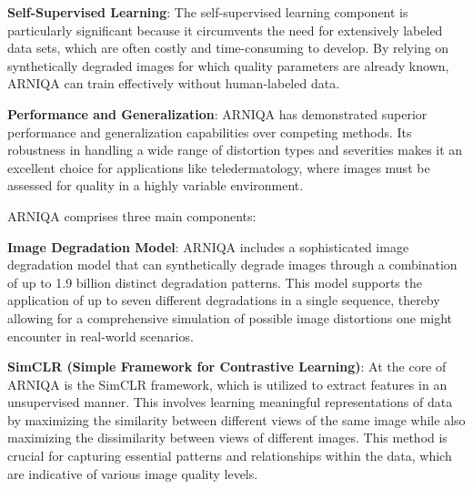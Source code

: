 \textbf{Self-Supervised Learning}: The self-supervised learning component is particularly significant because it circumvents the need for extensively labeled data sets, which are often costly and time-consuming to develop. By relying on synthetically degraded images for which quality parameters are already known, ARNIQA can train effectively without human-labeled data. \par
\vspace{\baselineskip}
\noindent
\textbf{Performance and Generalization}: ARNIQA has demonstrated superior performance and generalization capabilities over competing methods. Its robustness in handling a wide range of distortion types and severities makes it an excellent choice for applications like teledermatology, where images must be assessed for quality in a highly variable environment. \par
\vspace{\baselineskip}
\noindent
ARNIQA comprises three main components: 
\par
\vspace{\baselineskip}
\noindent
\textbf{Image Degradation Model}: ARNIQA includes a sophisticated image degradation model that can synthetically degrade images through a combination of up to 1.9 billion distinct degradation patterns. This model supports the application of up to seven different degradations in a single sequence, thereby allowing for a comprehensive simulation of possible image distortions one might encounter in real-world scenarios. \par
\vspace{\baselineskip}
\noindent
\textbf{SimCLR (Simple Framework for Contrastive Learning)}: At the core of ARNIQA is the SimCLR framework, which is utilized to extract features in an unsupervised manner. This involves learning meaningful representations of data by maximizing the similarity between different views of the same image while also maximizing the dissimilarity between views of different images. This method is crucial for capturing essential patterns and relationships within the data, which are indicative of various image quality levels. \par

